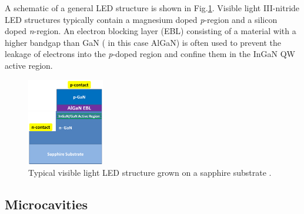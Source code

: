 A schematic of a general LED structure is shown in Fig.\ref{1.11}. Visible light III-nitride LED structures typically contain a magnesium doped {\it p}-region and a silicon doped {\it n}-region. An electron blocking layer  (EBL) consisting of a material with a higher bandgap than GaN ( in this case AlGaN) is often used to prevent the leakage of electrons into the {\it p}-doped region and confine them in the InGaN QW active region.

\begin{figure}[h]
	\centering
	\includegraphics[width=0.3\textwidth]{Figs/Ch1/led.png}
	\caption {Typical visible light LED structure grown on a sapphire substrate \cite{Ren2015}.}
	\label{1.11}
\end{figure}
\FloatBarrier 

\subsection{Microcavities}

